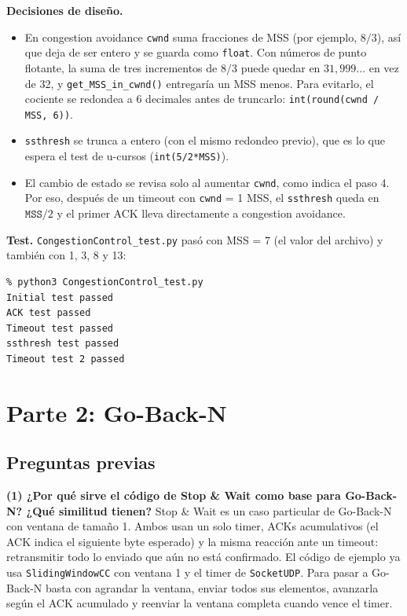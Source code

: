 \documentclass[11pt,letterpaper]{article}
\begin{document}
\textbf{Decisiones de diseño.}
\begin{itemize}[nosep]
  \item En congestion avoidance \texttt{cwnd} suma fracciones de MSS (por ejemplo,
        $8/3$), así que deja de ser entero y se guarda como \texttt{float}. Con números de
        punto flotante, la suma de tres incrementos de $8/3$ puede quedar en
        $31{,}999\ldots$ en vez de 32, y \texttt{get\_MSS\_in\_cwnd()} entregaría un MSS
        menos. Para evitarlo, el cociente se redondea a 6 decimales antes de truncarlo:
        \texttt{int(round(cwnd / MSS, 6))}.
  \item \texttt{ssthresh} se trunca a entero (con el mismo redondeo previo), que es lo que
        espera el test de u-cursos (\texttt{int(5/2*MSS)}).
  \item El cambio de estado se revisa solo al aumentar \texttt{cwnd}, como indica el
        paso 4. Por eso, después de un timeout con \texttt{cwnd} = 1 MSS, el
        \texttt{ssthresh} queda en $\texttt{MSS}/2$ y el primer ACK lleva directamente a
        congestion avoidance.
\end{itemize}

\textbf{Test.} \texttt{CongestionControl\_test.py} pasó con MSS = 7 (el valor del
archivo) y también con 1, 3, 8 y 13:

\begin{lstlisting}
% python3 CongestionControl_test.py
Initial test passed
ACK test passed
Timeout test passed
ssthresh test passed
Timeout test 2 passed
\end{lstlisting}

\section{Parte 2: Go-Back-N}

\subsection{Preguntas previas}

\textbf{(1) ¿Por qué sirve el código de Stop \& Wait como base para Go-Back-N? ¿Qué
similitud tienen?} Stop \& Wait es un caso particular de Go-Back-N con ventana de tamaño
1. Ambos usan un solo timer, ACKs acumulativos (el ACK indica el siguiente byte esperado)
y la misma reacción ante un timeout: retransmitir todo lo enviado que aún no está
confirmado. El código de ejemplo ya usa \texttt{SlidingWindowCC} con ventana 1 y el timer
de \texttt{SocketUDP}. Para pasar a Go-Back-N basta con agrandar la ventana, enviar todos
sus elementos, avanzarla según el ACK acumulado y reenviar la ventana completa cuando
vence el timer.
\end{document}
